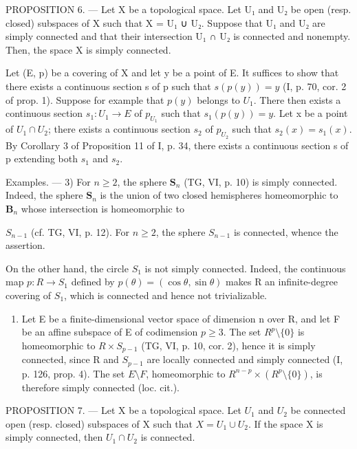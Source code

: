 PROPOSITION 6. --- Let X be a topological space. Let U₁ and U₂ be open (resp. closed) subspaces of X such that X = U₁ ∪ U₂. Suppose that U₁ and U₂ are simply connected and that their intersection U₁ ∩ U₂ is connected and nonempty. Then, the space X is simply connected.

Let (E, p) be a covering of X and let y be a point of E. It suffices to show that there exists a continuous section s of p such that \(s(p(y)) = y\) (I, p. 70, cor. 2 of prop. 1). Suppose for example that \(p(y)\) belongs to \(U_{1}\). There then exists a continuous section \(s_{1}: U_{1} \to E\) of \(p_{U_{1}}\) such that \(s_{1}(p(y)) = y\). Let x be a point of \(U_{1} \cap U_{2}\); there exists a continuous section \(s_{2}\) of \(p_{U_{2}}\) such that \(s_{2}(x) = s_{1}(x)\). By Corollary 3 of Proposition 11 of I, p. 34, there exists a continuous section s of p extending both \(s_{1}\) and \(s_{2}\).

Examples. --- 3) For \(n \geqslant 2\), the sphere \(\mathbf{S}_{n}\) (TG, VI, p. 10) is simply connected. Indeed, the sphere \(\mathbf{S}_{n}\) is the union of two closed hemispheres homeomorphic to \(\mathbf{B}_{n}\) whose intersection is homeomorphic to

\(S_{n-1}\) (cf. TG, VI, p. 12). For \(n \geqslant 2\), the sphere \(S_{n-1}\) is connected, whence the assertion.

On the other hand, the circle \(S_{1}\) is not simply connected. Indeed, the continuous map \(p: R \to S_{1}\) defined by \(p(\theta) = (\cos \theta, \sin \theta)\) makes R an infinite-degree covering of \(S_{1}\), which is connected and hence not trivializable.

\begin{enumerate}
\def\labelenumi{\arabic{enumi})}
\setcounter{enumi}{3}
\tightlist
\item
  Let E be a finite-dimensional vector space of dimension n over R, and let F be an affine subspace of E of codimension \(p \geqslant 3\). The set \(R^{p}\setminus\{0\}\) is homeomorphic to \(R \times S_{p-1}\) (TG, VI, p. 10, cor. 2), hence it is simply connected, since R and \(S_{p-1}\) are locally connected and simply connected (I, p. 126, prop. 4). The set \(E\setminus F\), homeomorphic to \(R^{n-p} \times (R^{p}\setminus\{0\})\), is therefore simply connected (loc. cit.).
\end{enumerate}

PROPOSITION 7. — Let X be a topological space. Let \(U_{1}\) and \(U_{2}\) be connected open (resp. closed) subspaces of X such that \(X = U_{1} \cup U_{2}\). If the space X is simply connected, then \(U_{1} \cap U_{2}\) is connected.

